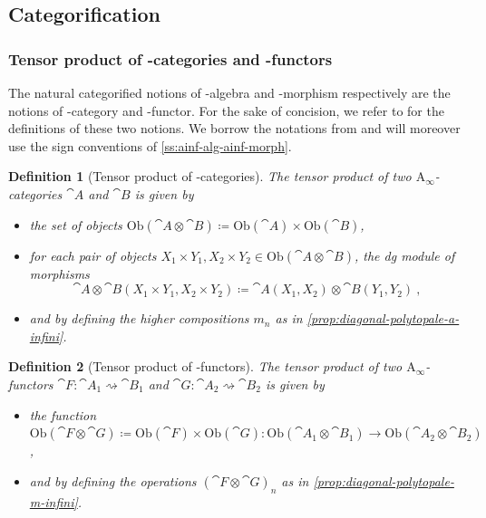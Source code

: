 \documentclass[twoside, 11pt]{amsart}
\newtheorem{definition}{Definition}[section]
\theoremstyle{remark}
\begin{document}
\subsection{Categorification}

\subsubsection{Tensor product of \Ainf -categories and \Ainf -functors}

The natural categorified notions of \Ainf -algebra and \Ainf -morphism respectively are the notions of \Ainf -category and \Ainf -functor. For the sake of concision, we refer to \cite[Chapter 1]{Seidel08} for the definitions of these two notions. We borrow the notations from \cite{Seidel08} and will moreover use the sign conventions of \cref{ss:ainf-alg-ainf-morph}. 

\begin{definition}[Tensor product of \Ainf -categories] \label{def:tensor-product-ainf-cat}
The \emph{tensor product} of two $\mathrm{A}_\infty$-categories $\cat{A}$ and $\cat{B}$ is given by 
\begin{itemize}[leftmargin=*]
  \item the set of objects $\mathrm{Ob}(\cat{A}\otimes \cat{B})\coloneqq \mathrm{Ob}(\cat{A})\times\mathrm{Ob}(\cat{B})$,
  \item for each pair of objects $X_1\times Y_1,X_2\times Y_2 \in \mathrm{Ob}(\cat{A}\otimes \cat{B})$, the dg module of morphisms \[\cat{A}\otimes \cat{B}(X_1\times Y_1,X_2\times Y_2)\coloneqq \cat{A}(X_1,X_2)\otimes\cat{B}(Y_1,Y_2) \ , \]
  \item and by defining the higher compositions $m_n$ as in \cref{prop:diagonal-polytopale-a-infini}.
\end{itemize}
\end{definition}

\begin{definition}[Tensor product of \Ainf -functors]
The \emph{tensor product} of two $\mathrm{A}_\infty$-functors $\cat{F}:\cat{A}_1 \rightsquigarrow \cat{B}_1$ and $\cat{G}:\cat{A}_2 \rightsquigarrow \cat{B}_2$ is given by 
\begin{itemize}[leftmargin=*]
\item the function $\mathrm{Ob}(\cat{F}\otimes \cat{G})\coloneqq \mathrm{Ob}(\cat{F})\times \mathrm{Ob}(\cat{G}) : \mathrm{Ob}(\cat{A}_1\otimes\cat{B}_1) \to \mathrm{Ob}(\cat{A}_2\otimes\cat{B}_2)$,
\item and by defining the operations $(\cat{F} \otimes \cat{G})_n$ as in \cref{prop:diagonal-polytopale-m-infini}.
\end{itemize}
\end{definition}
\end{document}
